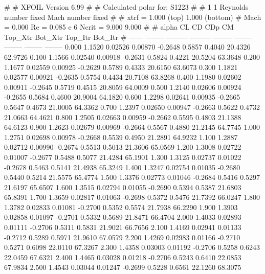 #  
#       XFOIL         Version 6.99
#  
# Calculated polar for: S1223                                           
#  
# 1 1 Reynolds number fixed          Mach number fixed         
#  
# xtrf =   1.000 (top)        1.000 (bottom)  
# Mach =   0.000     Re =     0.085 e 6     Ncrit =   9.000  9.000
#  
#   alpha    CL        CD       CDp       CM     Top_Xtr  Bot_Xtr  Top_Itr  Bot_Itr
#  ------ -------- --------- --------- -------- -------- -------- -------- --------
   0.000   1.1520   0.02526   0.00870  -0.2648   0.5857   0.4040  20.4326  62.9726
   0.100   1.1566   0.02540   0.00918  -0.2631   0.5824   0.4221  20.5204  63.3648
   0.200   1.1677   0.02559   0.00925  -0.2629   0.5789   0.4333  20.6150  63.6073
   0.300   1.1821   0.02577   0.00921  -0.2635   0.5754   0.4434  20.7108  63.8268
   0.400   1.1980   0.02602   0.00911  -0.2645   0.5719   0.4515  20.8059  64.0009
   0.500   1.2140   0.02606   0.00924  -0.2655   0.5684   0.4600  20.9004  64.1820
   0.600   1.2298   0.02641   0.00935  -0.2665   0.5647   0.4673  21.0005  64.3362
   0.700   1.2397   0.02650   0.00947  -0.2663   0.5622   0.4732  21.0663  64.4621
   0.800   1.2505   0.02663   0.00959  -0.2662   0.5595   0.4803  21.1388  64.6123
   0.900   1.2623   0.02679   0.00969  -0.2664   0.5567   0.4880  21.2145  64.7745
   1.000   1.2751   0.02698   0.00978  -0.2668   0.5539   0.4950  21.2891  64.9232
   1.100   1.2887   0.02712   0.00990  -0.2674   0.5513   0.5013  21.3606  65.0569
   1.200   1.3008   0.02722   0.01007  -0.2677   0.5488   0.5077  21.4284  65.1901
   1.300   1.3125   0.02737   0.01022  -0.2678   0.5463   0.5141  21.4938  65.3249
   1.400   1.3247   0.02754   0.01035  -0.2680   0.5440   0.5214  21.5575  65.4774
   1.500   1.3376   0.02773   0.01046  -0.2684   0.5416   0.5297  21.6197  65.6507
   1.600   1.3515   0.02794   0.01055  -0.2690   0.5394   0.5387  21.6803  65.8391
   1.700   1.3659   0.02817   0.01063  -0.2698   0.5372   0.5476  21.7392  66.0247
   1.800   1.3782   0.02833   0.01081  -0.2700   0.5352   0.5574  21.7938  66.2290
   1.900   1.3903   0.02858   0.01097  -0.2701   0.5332   0.5689  21.8471  66.4704
   2.000   1.4033   0.02893   0.01111  -0.2706   0.5311   0.5831  21.9021  66.7656
   2.100   1.4169   0.02941   0.01133  -0.2712   0.5289   0.5971  21.9610  67.0579
   2.200   1.4269   0.02983   0.01166  -0.2710   0.5271   0.6098  22.0110  67.3267
   2.300   1.4358   0.03003   0.01192  -0.2706   0.5258   0.6243  22.0459  67.6321
   2.400   1.4465   0.03028   0.01218  -0.2706   0.5243   0.6410  22.0853  67.9834
   2.500   1.4543   0.03044   0.01247  -0.2699   0.5228   0.6561  22.1260  68.3075
